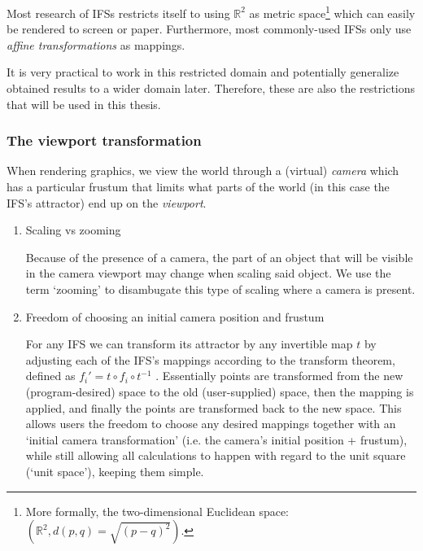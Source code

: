 \documentclass[11pt]{article}
\begin{document}

Most research of IFSs restricts itself to using \(\mathbb{R}^2\) as metric space\footnote{More formally, the two-dimensional Euclidean space: \(\left(\mathbb{R}^2, d(p, q) = \sqrt{(p - q)^2}\right)\).} which can easily be rendered to screen or paper.
Furthermore, most commonly-used IFSs only use \emph{affine transformations} as mappings.

It is very practical to work in this restricted domain 
and potentially generalize obtained results to a wider domain later.
Therefore, these are also the restrictions that will be used in this thesis.

\subsubsection{The viewport transformation}
\label{sec:org8b2b574}
\label{subsection:viewport_transformation}

When rendering graphics, we view the world through a (virtual) \emph{camera} which has a particular frustum 
that limits what parts of the world (in this case the IFS's attractor) end up on the \emph{viewport}.

\begin{enumerate}
\item Scaling vs zooming
\label{sec:org6928c59}

Because of the presence of a camera, the part of an object that will be visible in the camera viewport may change when scaling said object.
We use the term `zooming' to disambugate this type of scaling where a camera is present.

\item Freedom of choosing an initial camera position and frustum
\label{sec:orgde90512}

For any IFS we can transform its attractor by any invertible map \(t\) by adjusting each of the IFS's mappings according to the
transform theorem, defined as \(f_i' = t \circ f_i \circ t^{-1}\) \cite{barnsley1988fractals}. 
Essentially points are transformed from the new (program-desired) space to the old (user-supplied) space, then the mapping is applied, and finally the points are transformed back to the new space.
This allows users the freedom to choose any desired mappings together with an `initial camera transformation' (i.e. the camera's initial position + frustum),
while still allowing all calculations to happen with regard to the unit square (`unit space'), keeping them simple.
\end{enumerate}
\end{document}
